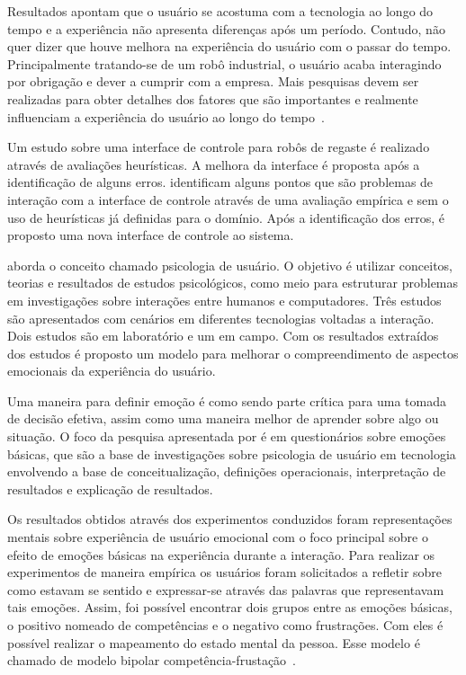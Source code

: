 Resultados apontam que o usuário se acostuma com a tecnologia ao longo do tempo e a experiência não apresenta diferenças após um período. Contudo, não quer dizer que houve melhora na experiência do usuário com o passar do tempo. Principalmente tratando-se de um robô industrial, o usuário acaba interagindo por obrigação e dever a cumprir com a empresa. Mais pesquisas devem ser realizadas para obter detalhes dos fatores que são importantes e realmente influenciam a experiência do usuário ao longo do tempo~\cite{buchner:2013}.

Um estudo sobre uma interface de controle para robôs de regaste é realizado através de avaliações heurísticas. A melhora da interface é proposta após a identificação de alguns erros. \textcite{naveed:2014} identificam alguns pontos que são problemas de interação com a interface de controle através de uma avaliação empírica e sem o uso de heurísticas já definidas para o domínio. Após a identificação dos erros, é proposto uma nova interface de controle ao sistema.

\textcite{saariluoma:2014} aborda o conceito chamado psicologia de usuário. O objetivo é utilizar conceitos, teorias e resultados de estudos psicológicos, como meio para estruturar problemas em investigações sobre interações entre humanos e computadores. Três estudos são apresentados com cenários em diferentes tecnologias voltadas a interação. Dois estudos são em laboratório e um em campo. Com os resultados extraídos dos estudos é proposto um modelo para melhorar o compreendimento de aspectos emocionais da experiência do usuário.

Uma maneira para definir emoção é como sendo parte crítica para uma tomada de decisão efetiva, assim como uma maneira melhor de aprender sobre algo ou situação. O foco da pesquisa apresentada por \textcite{saariluoma:2014} é em questionários sobre emoções básicas, que são a base de investigações sobre psicologia de usuário em tecnologia envolvendo a base de conceitualização, definições operacionais, interpretação de resultados e explicação de resultados.

Os resultados obtidos através dos experimentos conduzidos foram representações mentais sobre experiência de usuário emocional com o foco principal sobre o efeito de emoções básicas na experiência durante a interação. Para realizar os experimentos de maneira empírica os usuários foram solicitados a refletir sobre como estavam se sentido e expressar-se através das palavras que representavam tais emoções. Assim, foi possível encontrar dois grupos entre as emoções básicas, o positivo nomeado de competências e o negativo como frustrações. Com eles é possível realizar o mapeamento do estado mental da pessoa. Esse modelo é chamado de modelo bipolar competência-frustação~\cite{saariluoma:2014}.

